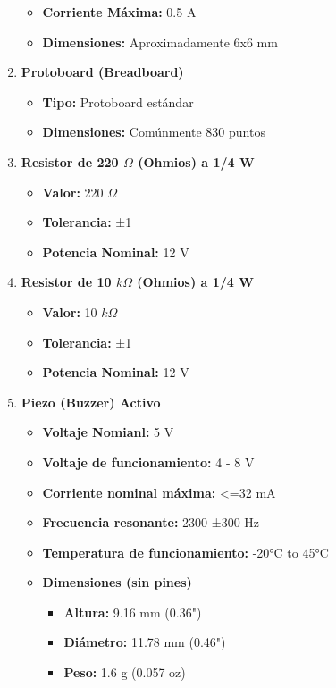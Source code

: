 \begin{enumerate}
\begin{itemize}
    \item \textbf{Corriente Máxima:} 0.5 A
    \item \textbf{Dimensiones:} Aproximadamente 6x6 mm
  \end{itemize}
  \item \textbf{Protoboard (Breadboard)}
  \begin{itemize}
    \item \textbf{Tipo:} Protoboard estándar
    \item \textbf{Dimensiones:} Comúnmente 830 puntos
  \end{itemize}
  \item \textbf{Resistor de 220 $\Omega$ (Ohmios) a 1/4 W}
  \begin{itemize}
    \item \textbf{Valor:} 220 $\Omega$
    \item \textbf{Tolerancia:} ±1
    \item \textbf{Potencia Nominal:} 12 V
  \end{itemize}
  \item \textbf{Resistor de 10 $k\Omega$ (Ohmios) a 1/4 W}
  \begin{itemize}
    \item \textbf{Valor:} 10 $k\Omega$
    \item \textbf{Tolerancia:} ±1
    \item \textbf{Potencia Nominal:} 12 V
  \end{itemize}
  \item \textbf{Piezo (Buzzer) Activo}
  \begin{itemize}
    \item \textbf{Voltaje Nomianl:} 5 V
    \item \textbf{Voltaje de funcionamiento:} 4 - 8 V
    \item \textbf{Corriente nominal máxima:} <=32 mA
    \item \textbf{Frecuencia resonante:} 2300 ±300 Hz
    \item \textbf{Temperatura de funcionamiento:} -20°C to 45°C
    \item \textbf{Dimensiones (sin pines)}
    \begin{itemize}
      \item \textbf{Altura:} 9.16 mm (0.36")
      \item \textbf{Diámetro:} 11.78 mm (0.46")
      \item \textbf{Peso:} 1.6 g (0.057 oz)
    \end{itemize}
  \end{itemize}
\end{enumerate}